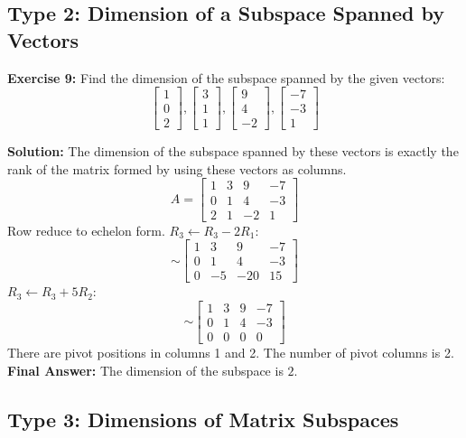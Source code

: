 \documentclass[12pt]{article}
\begin{document}
\subsection{Type 2: Dimension of a Subspace Spanned by Vectors}

\textbf{Exercise 9:} Find the dimension of the subspace spanned by the given vectors:
\[ \begin{bmatrix} 1 \\ 0 \\ 2 \end{bmatrix}, \begin{bmatrix} 3 \\ 1 \\ 1 \end{bmatrix}, \begin{bmatrix} 9 \\ 4 \\ -2 \end{bmatrix}, \begin{bmatrix} -7 \\ -3 \\ 1 \end{bmatrix} \]

\textbf{Solution:}
The dimension of the subspace spanned by these vectors is exactly the rank of the matrix formed by using these vectors as columns.
\[ A = \begin{bmatrix} 1 & 3 & 9 & -7 \\ 0 & 1 & 4 & -3 \\ 2 & 1 & -2 & 1 \end{bmatrix} \]
Row reduce to echelon form. $R_3 \leftarrow R_3 - 2R_1$:
\[ \sim \begin{bmatrix} 1 & 3 & 9 & -7 \\ 0 & 1 & 4 & -3 \\ 0 & -5 & -20 & 15 \end{bmatrix} \]
$R_3 \leftarrow R_3 + 5R_2$:
\[ \sim \begin{bmatrix} 1 & 3 & 9 & -7 \\ 0 & 1 & 4 & -3 \\ 0 & 0 & 0 & 0 \end{bmatrix} \]
There are pivot positions in columns 1 and 2. The number of pivot columns is 2.
\textbf{Final Answer:} The dimension of the subspace is $2$.

\subsection{Type 3: Dimensions of Matrix Subspaces}
\end{document}
